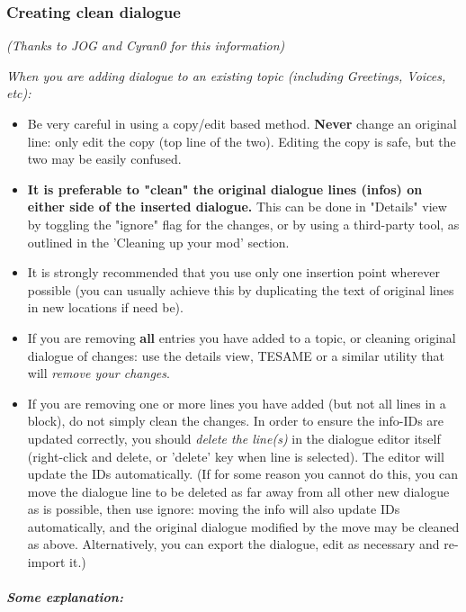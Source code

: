 \documentclass[
]{article}
\begin{document}
\hypertarget{creating-clean-dialogue}{%
\subsubsection{Creating clean dialogue}\label{creating-clean-dialogue}}

\emph{(Thanks to JOG and Cyran0 for this information)}

\emph{When you are adding dialogue to an existing topic (including
Greetings, Voices, etc):}

\begin{itemize}
\item
  Be very careful in using a copy/edit based method. \textbf{Never}
  change an original line: only edit the copy (top line of the two).
  Editing the copy is safe, but the two may be easily confused.
\item
  \textbf{It is preferable to "clean" the original dialogue lines
  (infos) on either side of the inserted dialogue.} This can be done in
  "Details" view by toggling the "ignore" flag for the changes, or by
  using a third-party tool, as outlined in the 'Cleaning up your mod'
  section.
\item
  It is strongly recommended that you use only one insertion point
  wherever possible (you can usually achieve this by duplicating the
  text of original lines in new locations if need be).
\item
  If you are removing \textbf{all} entries you have added to a topic, or
  cleaning original dialogue of changes: use the details view, TESAME or
  a similar utility that will \emph{remove your changes}.
\item
  If you are removing one or more lines you have added (but not all
  lines in a block), do not simply clean the changes. In order to ensure
  the info-IDs are updated correctly, you should \emph{delete the
  line(s)} in the dialogue editor itself (right-click and delete, or
  'delete' key when line is selected). The editor will update the IDs
  automatically. (If for some reason you cannot do this, you can move
  the dialogue line to be deleted as far away from all other new
  dialogue as is possible, then use ignore: moving the info will also
  update IDs automatically, and the original dialogue modified by the
  move may be cleaned as above. Alternatively, you can export the
  dialogue, edit as necessary and re-import it.)
\end{itemize}

\hypertarget{some-explanation}{%
\subparagraph{Some explanation:}\label{some-explanation}}
\end{document}
